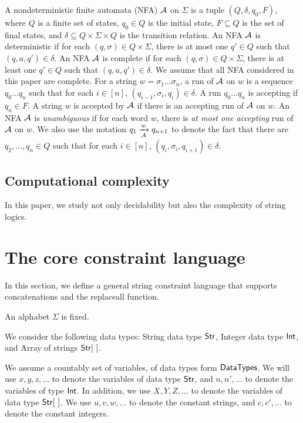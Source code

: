 A nondeterministic finite automata (NFA) $\mathcal{A}$ on $\Sigma$ is a tuple $(Q, \delta, q_0, F)$, where $Q$ is a finite set of states, $q_0 \in Q$ is the initial state, $F \subseteq Q$ is the set of final states, and $\delta \subseteq Q \times \Sigma \times Q$ is the transition relation. An NFA $\mathcal{A}$ is deterministic if for each $(q, \sigma) \in Q \times \Sigma$, there is at most one $q' \in Q$ such that $(q, a, q') \in \delta$. An NFA $\mathcal{A}$ is complete if for each $(q, \sigma) \in Q \times \Sigma$, there is at least one $q' \in Q$ such that $(q, a, q') \in \delta$. We assume that all NFA considered in this paper are complete. For a string $w = \sigma_1 \dots \sigma_n$, a run of $\mathcal{A}$ on $w$ is a sequence $q_0 \dots q_n$ such that for each $i \in [n]$, $(q_{i-1}, \sigma_i, q_i) \in \delta$. A run $q_0 \dots q_n$ is accepting if $q_n \in F$. A string $w$ is accepted by $\mathcal{A}$ if there is an accepting run of $\mathcal{A}$ on $w$. An NFA $\mathcal{A}$ is \emph{unambiguous} if for each word $w$, there is \emph{at most one accepting} run of $\mathcal{A}$ on $w$.
We also use the notation $q_1 \xrightarrow[\mathcal{A}]{w} q_{n+1}$ to denote the fact that there are $q_2,\dots, q_n \in Q$ such that for each $i \in [n]$, $(q_i, \sigma_i, q_{i+1}) \in \delta$.  

\subsection*{Computational complexity}
In this paper, we study not only decidability but also the complexity of string logics. 


\section{The core constraint language}

In this section, we define a general string constraint language that supports concatenations and the replaceall function.  

An alphabet $\Sigma$ is fixed.

We consider the following data types: String data type ${\sf Str}$, Integer data type ${\sf Int}$, and Array of strings $\str [\ ]$.


We assume a countably set of variables, of data types form ${\sf DataTypes}$. We will use $x, y, z, \dots$ to denote the variables of data type ${\sf Str}$, and $n, n', \dots$ to denote the variables of type ${\sf Int}$. In addition, we use $X, Y, Z, \dots$ to denote the variables of data type $\str[\ ]$.
We use $u, v, w, \dots$ to denote the constant strings, and $c, c',\dots$ to denote the constant integers.


